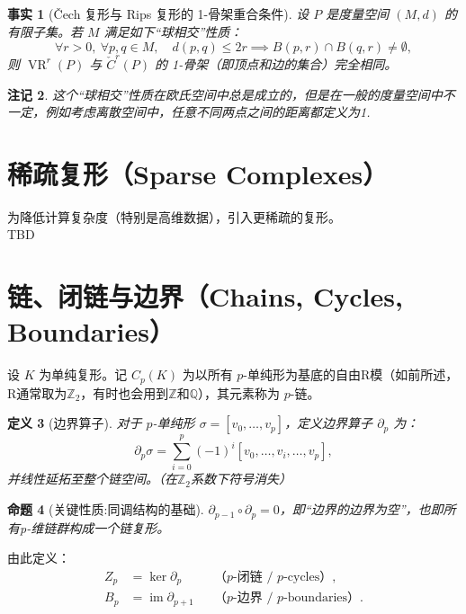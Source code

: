 \documentclass[UTF8]{ctexart}
\newtheorem{definition}{定义}[section]
\newtheorem{proposition}[definition]{命题}
\newtheorem{remark}[definition]{注记}
\newtheorem{fact}[definition]{事实}
\begin{document}
\begin{fact}[Čech 复形与 Rips 复形的 1-骨架重合条件]
\label{fact:cech-rips-1skeleton}
设 \(P\) 是度量空间 \((M,d)\) 的有限子集。若 \(M\) 满足如下“球相交”性质：
\[
\forall r>0,\ \forall p,q \in M,\quad d(p,q) \le 2r \implies B(p,r) \cap B(q,r) \neq \emptyset,
\]
则 \(\operatorname{VR}^r(P)\) 与 \(\check{C}^r(P)\) 的 1-骨架（即顶点和边的集合）完全相同。
\end{fact}

\begin{remark}
这个“球相交”性质在欧氏空间中总是成立的，但是在一般的度量空间中不一定，例如考虑离散空间中，任意不同两点之间的距离都定义为1.
\end{remark}

\section{稀疏复形（Sparse Complexes）}
\label{sec:sparse-complexes}

为降低计算复杂度（特别是高维数据），引入更稀疏的复形。
\\
TBD

\section{链、闭链与边界（Chains, Cycles, Boundaries）}
\label{sec:chains-cycles-boundaries}

设 \(K\) 为单纯复形。记 \(C_p(K)\) 为以所有 \(p\)-单纯形为基底的自由R模（如前所述，R通常取为$\mathbb{Z}_{2}$，有时也会用到$\mathbb{Z}$和$\mathbb{Q}$），其元素称为 \(p\)-链。

\begin{definition}[边界算子]
\label{def:boundary-operator}
对于 \(p\)-单纯形 \(\sigma = [v_0, \dots, v_p]\)，定义边界算子 \(\partial_p\) 为：
\[
\partial_p \sigma = \sum_{i=0}^p (-1)^{i}[v_0, \dots, \hat{v}_i, \dots, v_p],
\]
并线性延拓至整个链空间。（在$\mathbb{Z}_{2}$系数下符号消失）
\end{definition}

\begin{proposition}[关键性质:同调结构的基础]
\label{prop:boundary-square-zero}
\(\partial_{p-1} \circ \partial_p = 0\)，即“边界的边界为空”，也即所有p-维链群构成一个链复形。
\end{proposition}

由此定义：
\begin{align*}
    Z_p &= \ker \partial_p && \text{（\(p\)-闭链 / \(p\)-cycles）}, \\
    B_p &= \operatorname{im} \partial_{p+1} && \text{（\(p\)-边界 / \(p\)-boundaries）}.
\end{align*}
\end{document}
